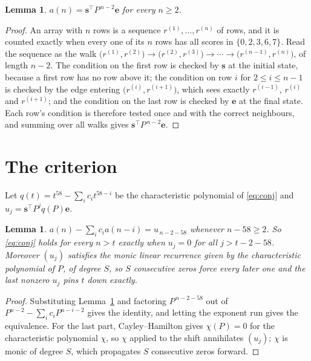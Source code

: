 \documentclass[11pt,a4paper]{article}
\theoremstyle{plain}
\newtheorem{lemma}[theorem]{Lemma}
\theoremstyle{definition}
\begin{document}
\begin{lemma}\label{lem:walk}
$a(n)=\mathbf{s}^{\!\top}P^{\,n-2}\mathbf{e}$ for every $n\ge2$.
\end{lemma}

\begin{proof}
An array with $n$ rows is a sequence $r^{(1)},\dots,r^{(n)}$ of rows, and it is counted
exactly when every one of its $n$ rows has all scores in $\{0,2,3,6,7\}$. Read the sequence as the
walk $\bigl(r^{(1)},r^{(2)}\bigr)\to\bigl(r^{(2)},r^{(3)}\bigr)\to\cdots\to
\bigl(r^{(n-1)},r^{(n)}\bigr)$, of length $n-2$. The condition on the first row is
checked by $\mathbf{s}$ at the initial state, because a first row has no row above it; the
condition on row $i$ for $2\le i\le n-1$ is checked by the edge entering
$\bigl(r^{(i)},r^{(i+1)}\bigr)$, which sees exactly $r^{(i-1)}$, $r^{(i)}$ and
$r^{(i+1)}$; and the condition on the last row is checked by $\mathbf{e}$ at the final
state. Each row's condition is therefore tested once and with the correct neighbours, and
summing over all walks gives $\mathbf{s}^{\!\top}P^{\,n-2}\mathbf{e}$.
\end{proof}

\section{The criterion}

Let $q(t)=t^{58}-\sum_i c_i t^{58-i}$ be the characteristic polynomial of
\eqref{eq:conj} and $u_j=\mathbf{s}^{\!\top}P^{j}q(P)\mathbf{e}$.

\begin{lemma}\label{lem:crit}
$a(n)-\sum_i c_i a(n-i)=u_{\,n-2-58}$ whenever $n-58\ge2$. So \eqref{eq:conj}
holds for every $n>t$ exactly when $u_j=0$ for all $j>t-2-58$. Moreover $(u_j)$
satisfies the monic linear recurrence given by the characteristic polynomial of $P$, of
degree $S$, so $S$ consecutive zeros force every later one and the last nonzero $u_j$ pins
$t$ down exactly.
\end{lemma}

\begin{proof}
Substituting Lemma~\ref{lem:walk} and factoring $P^{\,n-2-58}$ out of
$P^{n-2}-\sum_i c_i P^{n-i-2}$ gives the identity, and letting the exponent run gives the
equivalence. For the last part, Cayley--Hamilton gives $\chi(P)=0$ for the characteristic
polynomial $\chi$, so $\chi$ applied to the shift annihilates $(u_j)$; $\chi$ is monic of
degree $S$, which propagates $S$ consecutive zeros forward.
\end{proof}
\end{document}
